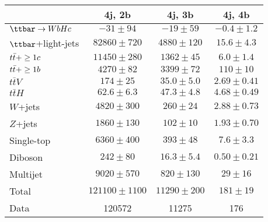 \begin{table}[htbp]
\small
\begin{center}
\begin{tabular}{l*{3}{c}}
\hline\hline
 & 4j, 2b & 4j, 3b & 4j, 4b \\
\hline
$\Hc$  &   $ -31 \pm 94 $ &   $ -19 \pm 59 $ &   $ -0.4 \pm 1.2 $ \\ 
\hline
$\ttbar$+light-jets  &   $ 82860 \pm 720 $ &   $ 4880 \pm 120 $ &   $ 15.6 \pm 4.3 $ \\ 
$t\bar{t}+\geq1c$  &   $ 11450 \pm 280 $ &   $ 1362 \pm 45 $ &   $ 6.0 \pm 1.4 $ \\ 
$t\bar{t}+\geq1b$  &   $ 4270 \pm 82 $ &   $ 3399 \pm 72 $ &   $ 110 \pm 10 $ \\ 
$t\bar{t}V$  &   $ 174 \pm 25 $ &   $ 35.0 \pm 5.0 $ &   $ 2.69 \pm 0.41 $ \\ 
$t\bar{t}H$  &   $ 62.6 \pm 6.3 $ &   $ 47.3 \pm 4.8 $ &   $ 4.68 \pm 0.49 $ \\ 
$W$+jets  &   $ 4820 \pm 300 $ &   $ 260 \pm 24 $ &   $ 2.88 \pm 0.73 $ \\ 
$Z$+jets  &   $ 1860 \pm 130 $ &   $ 102 \pm 10 $ &   $ 1.93 \pm 0.70 $ \\ 
Single-top  &   $ 6360 \pm 400 $ &   $ 393 \pm 48 $ &   $ 7.6 \pm 3.3 $ \\ 
Diboson  &   $ 242 \pm 80 $ &   $ 16.3 \pm 5.4 $ &   $ 0.50 \pm 0.21 $ \\ 
Multijet  &   $ 9020 \pm 570 $ &   $ 820 \pm 130 $ &   $ 29 \pm 16 $ \\ 
\hline
Total & $ 121100 \pm 1100 $ &   $ 11290 \pm 200 $ &   $ 181 \pm 19 $ \\
\hline
Data & 120572  & 11275  & 176  \\ 
\hline\hline      
\end{tabular}
\vspace{0.2cm}


\end{center}
\end{table}
